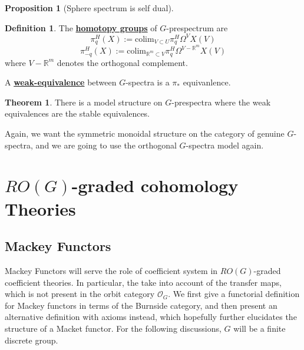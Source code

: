 \documentclass{article}
\theoremstyle{definition}
\newtheorem{theorem}{Theorem}[section]
\theoremstyle{definition}
\newtheorem{definition}{Definition}[theorem]
\theoremstyle{definition}
\theoremstyle{definition}
\newtheorem{proposition}{Proposition}[theorem]
\theoremstyle{definition}
\theoremstyle{definition}
\theoremstyle{definition}
\begin{document}
\begin{tcolorbox}[colback=blue!5!white,colframe=blue!30!white]
\begin{proposition}[Sphere spectrum is self dual]

\end{proposition}
\end{tcolorbox}





\begin{tcolorbox}[colback=purple!5!white,colframe=purple!75!black]
\begin{definition}
The \underline{\textbf{homotopy groups}} of $G$-prespectrum are 
\[\pi_q^H(X):=\textrm{colim}_{V\subset U}\pi_q^H\Omega^VX(V)\]
\[\pi_{-q}^H(X):=\textrm{colim}_{\mathbb{R}^m\subset V}\pi_q^H\Omega^{V-\mathbb{R}^m}X(V)\]
where $V-\mathbb{R}^m$ denotes the orthogonal complement. 

A \underline{\textbf{weak-equivalence}} between $G$-spectra is a $\pi_*$ equivanlence. 
\end{definition}
\end{tcolorbox}


\begin{tcolorbox}[colback=red!5!white,colframe=red!30!white]
\begin{theorem}
There is a model structure on $G$-prespectra where the weak equivalences are the stable equivalences. 
\end{theorem}
\end{tcolorbox}
Again, we want the symmetric monoidal structure on the category of genuine $G$-spectra, and we are going to use the orthogonal $G$-spectra model again. 














\section{$RO(G)$-graded cohomology Theories}
\subsection{Mackey Functors}
Mackey Functors will serve the role of coefficient system in $RO(G)$-graded coefficient theories. In particular, the take into account of the transfer maps, which is not present in the orbit category $\mathcal{O}_G$. We first give a functorial definition for Mackey functors in terms of the Burnside category, and then present an alternative definition with axioms instead, which hopefully further elucidates the structure of a Macket functor. For the following discussions, $G$ will be a finite discrete group.
\end{document}
